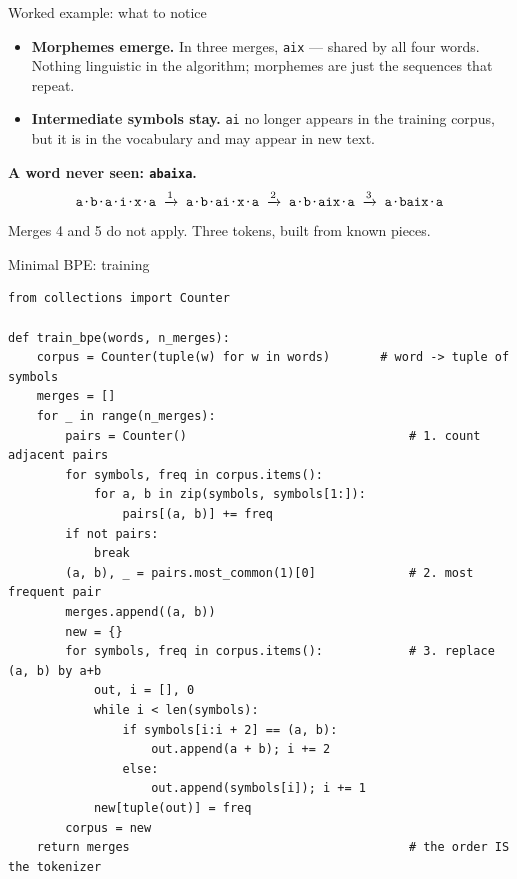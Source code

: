 \documentclass[11pt,aspectratio=169]{beamer}
\newcommand{\dest}[1]{\textcolor{structure}{\textbf{#1}}}
\newcommand{\sep}{\textperiodcentered}
\begin{document}
\begin{frame}{Worked example: what to notice}
  \begin{itemize}
    \item \dest{Morphemes emerge.} In three merges, \texttt{aix} --- shared by all four
          words. Nothing linguistic in the algorithm; morphemes are just the sequences that
          repeat.
    \item \dest{Intermediate symbols stay.} \texttt{ai} no longer appears in the training
          corpus, but it is in the vocabulary and may appear in new text.
  \end{itemize}

  \vspace{1em}
  \dest{A word never seen: \texttt{abaixa}.}
  \[
    \texttt{a\sep b\sep a\sep i\sep x\sep a}
    \;\xrightarrow{1}\; \texttt{a\sep b\sep ai\sep x\sep a}
    \;\xrightarrow{2}\; \texttt{a\sep b\sep aix\sep a}
    \;\xrightarrow{3}\; \texttt{a\sep baix\sep a}
  \]
  Merges 4 and 5 do not apply. Three tokens, built from known pieces.
\end{frame}

\begin{frame}[fragile]{Minimal BPE: training}
\begin{lstlisting}[style=py,basicstyle=\ttfamily\tiny]
from collections import Counter

def train_bpe(words, n_merges):
    corpus = Counter(tuple(w) for w in words)       # word -> tuple of symbols
    merges = []
    for _ in range(n_merges):
        pairs = Counter()                               # 1. count adjacent pairs
        for symbols, freq in corpus.items():
            for a, b in zip(symbols, symbols[1:]):
                pairs[(a, b)] += freq
        if not pairs:
            break
        (a, b), _ = pairs.most_common(1)[0]             # 2. most frequent pair
        merges.append((a, b))
        new = {}
        for symbols, freq in corpus.items():            # 3. replace (a, b) by a+b
            out, i = [], 0
            while i < len(symbols):
                if symbols[i:i + 2] == (a, b):
                    out.append(a + b); i += 2
                else:
                    out.append(symbols[i]); i += 1
            new[tuple(out)] = freq
        corpus = new
    return merges                                       # the order IS the tokenizer
\end{lstlisting}
\end{frame}
\end{document}
